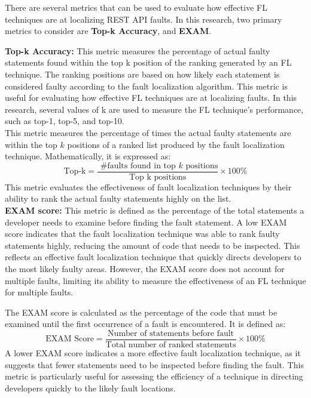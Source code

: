 \documentclass[conference]{IEEEtran}
\begin{document}
There are several metrics that can be used to evaluate how effective FL techniques are at localizing REST API faults. In this research, two primary metrics to consider are \textbf{Top-k Accuracy}, and \textbf{EXAM}.


   
     \textbf{Top-k Accuracy:} This metric measures the percentage of actual faulty statements found within the top k position of the ranking generated by an FL technique. The ranking positions are based on how likely each statement is considered faulty according to the fault localization algorithm. This metric is useful for evaluating how effective FL techniques are at localizing faults. In this research, several values of k are used to measure the FL technique's performance, such as top-1, top-5, and top-10.
    \\
    This metric measures the percentage of times the actual faulty statements are within the top $k$ positions of a ranked list produced by the fault localization technique. Mathematically, it is expressed as:
    \[
    \text{Top-k} = \frac{\text{ \#faults found in top } k \text{ positions}}{\text{Top k positions}} \times 100\%
    \]
    This metric evaluates the effectiveness of fault localization techniques by their ability to rank the actual faulty statements highly on the list. 
    \\

    \textbf{EXAM score:}  This metric is defined as the percentage of the total statements a developer needs to examine before finding the fault statement. A low EXAM score indicates that the fault localization technique was able to rank faulty statements highly, reducing the amount of code that needs to be inspected. This reflects an effective fault localization technique that quickly directs developers to the most likely faulty areas. However, the EXAM score does not account for multiple faults, limiting its ability to measure the effectiveness of an FL technique for multiple faults.

    The EXAM score is calculated as the percentage of the code that must be examined until the first occurrence of a fault is encountered. It is defined as:
    \\
    \[
    \text{EXAM Score} = \frac{\text{Number of statements before fault}}{\text{Total number of ranked statements}} \times 100\%
    \]
    A lower EXAM score indicates a more effective fault localization technique, as it suggests that fewer statements need to be inspected before finding the fault. This metric is particularly useful for assessing the efficiency of a technique in directing developers quickly to the likely fault locations.
    \\ \\
\end{document}
